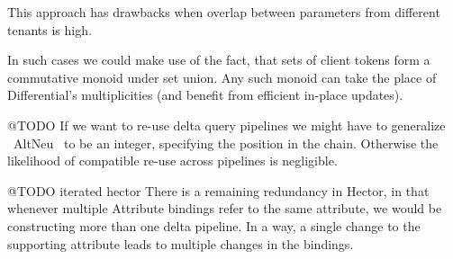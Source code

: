 \documentclass[../catalog.tex]{subfiles}
\begin{document}
This approach has drawbacks when overlap between parameters from
different tenants is high.

In such cases we could make use of the fact, that sets of client
tokens form a commutative monoid under set union. Any such monoid can
take the place of Differential's multiplicities (and benefit from
efficient in-place updates).

@TODO
If we want to re-use delta query pipelines we might have to generalize
~AltNeu~ to be an integer, specifying the position in the
chain. Otherwise the likelihood of compatible re-use across pipelines
is negligible.

@TODO iterated hector
There is a remaining redundancy in Hector, in that whenever multiple
Attribute bindings refer to the same attribute, we would be
constructing more than one delta pipeline. In a way, a single change
to the supporting attribute leads to multiple changes in the bindings.
\end{document}
